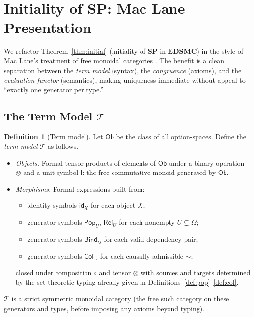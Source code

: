 \documentclass[12pt,a4paper]{article}
\theoremstyle{definition}
\newtheorem{definition}[theorem]{Definition}
\theoremstyle{remark}
\newcommand{\SP}{\mathbf{SP}}
\newcommand{\EDSMC}{\mathbf{EDSMC}}
\begin{document}
\section{Initiality of \texorpdfstring{$\SP$}{SP}: Mac Lane Presentation}
\label{sec:initiality-maclane}

We refactor Theorem~\ref{thm:initial} (initiality of $\SP$ in $\EDSMC$) in the
style of Mac Lane's treatment of free monoidal categories \citep{maclane1998}.
The benefit is a clean separation between the \emph{term model} (syntax),
the \emph{congruence} (axioms), and the \emph{evaluation functor} (semantics),
making uniqueness immediate without appeal to ``exactly one generator per type.''

\subsection{The Term Model \texorpdfstring{$\mathcal{T}$}{T}}

\begin{definition}[Term model]
\label{def:term-model}
Let $\mathsf{Ob}$ be the class of all option-spaces. Define the \emph{term model}
$\mathcal{T}$ as follows.
\begin{itemize}
  \item \emph{Objects.} Formal tensor-products of elements of $\mathsf{Ob}$ under
    a binary operation $\otimes$ and a unit symbol $\mathsf{I}$: the free commutative
    monoid generated by $\mathsf{Ob}$.
  \item \emph{Morphisms.} Formal expressions built from:
    \begin{itemize}
      \item identity symbols $\mathsf{id}_X$ for each object $X$;
      \item generator symbols $\mathsf{Pop}_U$, $\mathsf{Ref}_U$ for each
        nonempty $U\subsetneq\Omega$;
      \item generator symbols $\mathsf{Bind}_{ij}$ for each valid dependency pair;
      \item generator symbols $\mathsf{Col}_\sim$ for each causally admissible $\sim$;
    \end{itemize}
    closed under composition $\circ$ and tensor $\otimes$ with sources and targets
    determined by the set-theoretic typing already given in
    Definitions~\ref{def:pop}--\ref{def:col}.
\end{itemize}
$\mathcal{T}$ is a strict symmetric monoidal category (the free such category on
these generators and types, before imposing any axioms beyond typing).
\end{definition}
\end{document}
